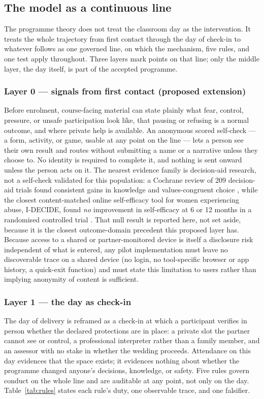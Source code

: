 \subsection{The model as a continuous line}
The programme theory does not treat the classroom day as the intervention. It treats the whole
trajectory from first contact through the day of check-in to whatever follows as one governed line,
on which the mechanism, five rules, and one test apply throughout. Three layers mark points on that
line; only the middle layer, the day itself, is part of the accepted programme.

\subsubsection*{Layer 0 --- signals from first contact (proposed extension)}
Before enrolment, course-facing material can state plainly what fear, control, pressure, or unsafe
participation look like, that pausing or refusing is a normal outcome, and where private help is
available. An anonymous scored self-check --- a form, activity, or game, usable at any point on the
line --- lets a person see their own result and routes without submitting a name or a narrative unless
they choose to. No identity is required to complete it, and nothing is sent onward unless the person
acts on it. The nearest evidence family is decision-aid research, not a self-check validated for this
population: a Cochrane review of 209 decision-aid trials found consistent gains in knowledge and
values-congruent choice \cite{ref14}, while the closest content-matched online self-efficacy tool for
women experiencing abuse, I-DECIDE, found \emph{no} improvement in self-efficacy at 6 or 12 months in a
randomised controlled trial \cite{ref119,ref120}. That null result is reported here, not
set aside, because it is the closest outcome-domain precedent this proposed layer has. Because
access to a shared or partner-monitored device is itself a disclosure risk independent of what is
entered, any pilot implementation must leave no discoverable trace on a shared device (no login, no
tool-specific browser or app history, a quick-exit function) and must state this limitation to
users rather than implying anonymity of content is sufficient.

\subsubsection*{Layer 1 --- the day as check-in}
The day of delivery is reframed as a check-in at which a participant verifies in person whether the
declared protections are in place: a private slot the partner cannot see or control, a professional
interpreter rather than a family member, and an assessor with no stake in whether the wedding
proceeds. Attendance on this day evidences that the space exists; it evidences nothing about whether
the programme changed anyone's decisions, knowledge, or safety. Five rules govern conduct on the whole
line and are auditable at any point, not only on the day. Table~\ref{tab:rules} states each rule's
duty, one observable trace, and one falsifier.

